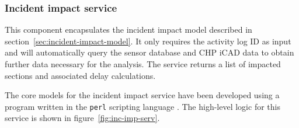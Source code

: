 \documentclass[12pt]{report}
\begin{document}
\subsubsection{Incident impact service}

This component encapsulates the incident impact model described in
section~\ref{sec:incident-impact-model}.  It only requires the
activity log ID as input and will automatically query the sensor
database and \ac{CHP} \ac{iCAD} data to obtain further data necessary
for the analysis.  The service returns a list of impacted sections and
associated delay calculations.

The core models for the incident impact service have been developed
using a program written in the \texttt{perl} scripting language
\citep{FIXME}.  The high-level logic for this service is shown in
figure~\ref{fig:inc-imp-serv}.
\end{document}
